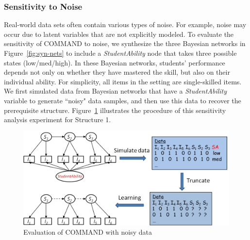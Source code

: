 \documentclass{edm_template}
\newcommand{\hl}[1]{\colorbox{yellow}{#1}}
\begin{document}
	
	\subsubsection{Sensitivity to Noise}	
	
	Real-world data sets often contain various types of noise.
	For example,  noise may occur due to latent variables that are not explicitly modeled. 
	To evaluate the sensitivity of COMMAND to noise, we synthesize the three Bayesian networks in Figure~\ref{fig:syn-nets} to include a \emph{StudentAbility} node 
	that takes three possible states (low/med/high). 
	In these Bayesian networks, students' performance depends not only on whether they have mastered the skill, but also on their individual ability. %
	For simplicity, all items in the setting are single-skilled items. 
	We first simulated data from  Bayesian networks that have a \emph{StudentAbility} variable to generate ``noisy" data samples, and 
	then use this data to recover the prerequisite structure. %
	Figure~\ref{fig:stuabilitymodel} illustrates the procedure of this sensitivity analysis experiment for Structure 1.
	
			\begin{figure}[!ht]
				\begin{center}
					\includegraphics[width=.95\linewidth]{figures/studentability.png}
				\end{center}
				\caption{Evaluation of COMMAND with noisy data} 
				\label{fig:stuabilitymodel}
			\end{figure}
			
\end{document}
